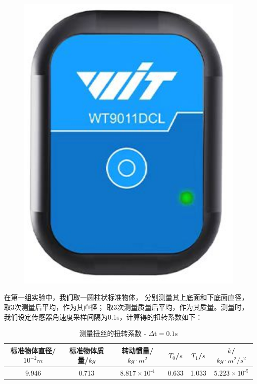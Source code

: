 \documentclass[12pt,hyperref,a4paper,UTF8]{ctexart}
\begin{document}
\begin{figure}[htbp]
    \centering
    \includegraphics{sensor.eps}
    \caption{}
\end{figure}

在第一组实验中，我们取一圆柱状标准物体，
分别测量其上底面和下底面直径，取3次测量后平均，作为其直径；
取3次测量质量后平均，作为其质量。测量时，
我们设定传感器角速度采样间隔为0.1s，计算得的扭转系数如下：

\begin{table}[h!]
\centering
\begin{tabular}{|c|c|c|c|c|c|}
    \hline
      标准物体直径/$ 10^{-2} m $ & 标准物体质量/$kg$ & 转动惯量/$kg·m^2$ & $T_0$/$s$ & $T_1$/$s$ & $k$/$kg·m^2/s^2$\\
    \hline
      9.946 & 0.713 & $\text{8.817} \times \text{10}^{\text{-4}}$ & 0.633 & 1.033 & $\text{5.223} \times \text{10}^{\text{-5}}$ \\
    \hline
\end{tabular}
\caption{测量扭丝的扭转系数 - $ \Delta \text{t} = \text{0.1s} $}
\end{table}
\end{document}
